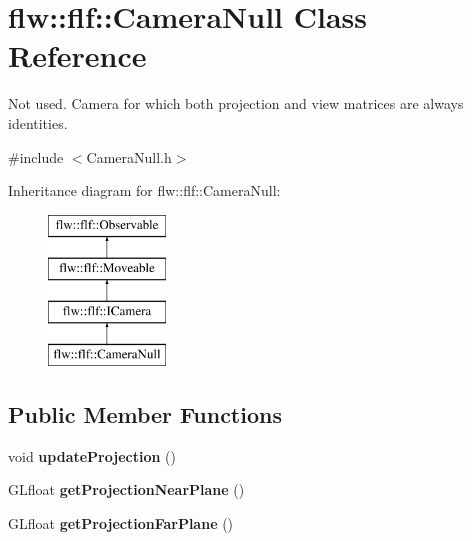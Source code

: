 \hypertarget{classflw_1_1flf_1_1CameraNull}{}\section{flw\+:\+:flf\+:\+:Camera\+Null Class Reference}
\label{classflw_1_1flf_1_1CameraNull}


Not used. Camera for which both projection and view matrices are always identities.  




{\ttfamily \#include $<$Camera\+Null.\+h$>$}

Inheritance diagram for flw\+:\+:flf\+:\+:Camera\+Null\+:\begin{figure}[H]
\begin{center}
\leavevmode
\includegraphics[height=4.000000cm]{classflw_1_1flf_1_1CameraNull}
\end{center}
\end{figure}
\subsection*{Public Member Functions}
\begin{DoxyCompactItemize}
\item 
void {\bfseries update\+Projection} ()\hypertarget{classflw_1_1flf_1_1CameraNull_ae8a26e5e560067bd9a84387a863d38f5}{}\label{classflw_1_1flf_1_1CameraNull_ae8a26e5e560067bd9a84387a863d38f5}

\item 
G\+Lfloat {\bfseries get\+Projection\+Near\+Plane} ()\hypertarget{classflw_1_1flf_1_1CameraNull_a6ccddc568aba10bb69c05dadf8b3c89a}{}\label{classflw_1_1flf_1_1CameraNull_a6ccddc568aba10bb69c05dadf8b3c89a}

\item 
G\+Lfloat {\bfseries get\+Projection\+Far\+Plane} ()\hypertarget{classflw_1_1flf_1_1CameraNull_a09741d600721440c3330d6404c2874d7}{}\label{classflw_1_1flf_1_1CameraNull_a09741d600721440c3330d6404c2874d7}

\end{DoxyCompactItemize}
